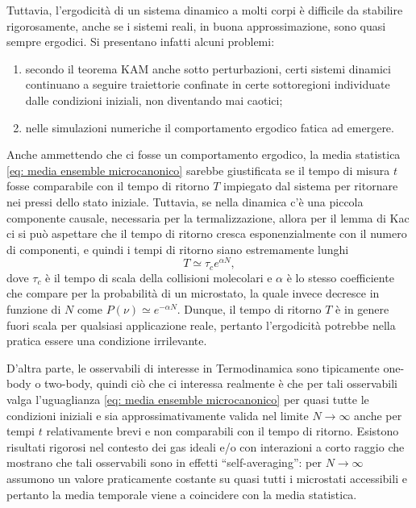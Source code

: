 Tuttavia, l'ergodicità di un sistema dinamico a molti corpi è difficile da stabilire rigorosamente, anche se i sistemi reali, in buona approssimazione, sono quasi sempre ergodici. Si presentano infatti alcuni problemi:
\begin{enumerate}
    \item secondo il teorema KAM anche sotto perturbazioni, certi sistemi dinamici continuano a seguire traiettorie confinate in certe sottoregioni individuate dalle condizioni iniziali, non diventando mai caotici;
    \item nelle simulazioni numeriche il comportamento ergodico fatica ad emergere.
\end{enumerate}
Anche ammettendo che ci fosse un comportamento ergodico, la media statistica \eqref{eq: media ensemble microcanonico} sarebbe giustificata se il tempo di misura $t$ fosse comparabile con il tempo di ritorno $T$ impiegato dal sistema per ritornare nei pressi dello stato iniziale. Tuttavia, se nella dinamica c'è una piccola componente causale, necessaria per la termalizzazione, allora per il lemma di Kac ci si può aspettare che il tempo di ritorno cresca esponenzialmente con il numero di componenti, e quindi i tempi di ritorno siano estremamente lunghi 
\begin{equation}
    T \simeq \tau_c e^{\alpha N},
\end{equation}
dove $\tau_c$ è il tempo di scala della collisioni molecolari e $\alpha$ è lo stesso coefficiente che compare per la probabilità di un microstato, la quale invece decresce in funzione di $N$ come $P(\nu) \simeq e^{-\alpha N}$. Dunque, il tempo di ritorno $T$ è in genere fuori scala per qualsiasi applicazione reale, pertanto l'ergodicità potrebbe nella pratica essere una condizione irrilevante. 

D'altra parte, le osservabili di interesse in Termodinamica sono tipicamente one-body o two-body, quindi ciò che ci interessa realmente è che per tali osservabili valga l'uguaglianza \eqref{eq: media ensemble microcanonico} per quasi tutte le condizioni iniziali e sia approssimativamente valida nel limite $N\to\infty$ anche per tempi $t$ relativamente brevi e non
comparabili con il tempo di ritorno. Esistono risultati rigorosi nel contesto dei gas ideali e/o con interazioni a corto raggio che mostrano che tali osservabili sono in effetti ``self-averaging'': per $N\to\infty$ assumono un valore praticamente costante su quasi tutti i microstati accessibili e pertanto la media temporale viene a coincidere con la media statistica. 

